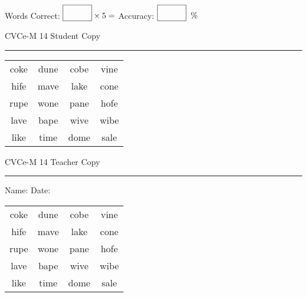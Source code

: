 \documentclass{memoir}
\begin{document}
\small

Words Correct: $\fbox{\phantom{\huge 100}} \times 5 = $ Accuracy: $\fbox{\phantom{\huge 100}}\;\; \%$ 

\vfill

\newpage


\footnotesize \noindent
CVCe-M 14 \hfill Student Copy
\smallskip
\hrule

\Large

\setlength{\tabcolsep}{14pt}
\def\arraystretch{2}

{\selectfont


\begin{vplace}[0.5]
\begin{center}
\begin{tabular}{cccc}
coke & dune & cobe & vine \\
hife & mave & lake & cone \\
rupe & wone & pane & hofe \\
lave & bape & wive & wibe \\
like & time & dome & sale \\
\end{tabular}
\end{center}
\end{vplace}

}

\newpage

\footnotesize \noindent
CVCe-M 14 \hfill Teacher Copy
\smallskip
\hrule

\small

\vfill

\noindent
Name: \underline{\hspace{1.75in}} \hfill Date: \underline{\hspace{1in}}

\Large

{\selectfont


\begin{vplace}[0.5]
\begin{center}
\begin{tabular}{cccc}
coke & dune & cobe & vine \\
hife & mave & lake & cone \\
rupe & wone & pane & hofe \\
lave & bape & wive & wibe \\
like & time & dome & sale \\
\end{tabular}
\end{center}
\end{vplace}



}
\end{document}
